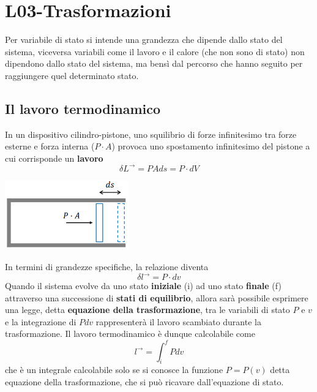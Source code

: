 \section{L03-Trasformazioni}
Per variabile di stato si intende una grandezza che dipende dallo stato del sistema, viceversa variabili come il lavoro e il calore (che non sono di stato) non dipendono dallo stato del sistema, ma bensì dal percorso che hanno seguito per raggiungere quel determinato stato.
\subsection{Il lavoro termodinamico}
In un dispositivo cilindro-pistone, uno squilibrio di forze infinitesimo tra forze esterne e forza interna ($P \cdot A$) provoca uno spostamento infinitesimo del pistone a cui corrisponde un \textbf{lavoro}
\[
    \delta L^\rightarrow  = P A ds = P \cdot dV
\]
\begin{center}
    \includegraphics[height=3cm]{../L03/img1.PNG}
\end{center}
In termini di grandezze specifiche, la relazione diventa
\[
    \delta l^\rightarrow = P \cdot dv
\]
Quando il sistema evolve da uno stato \textbf{iniziale} (i) ad uno stato \textbf{finale} (f) attraverso una successione di \textbf{stati di equilibrio}, allora sarà possibile esprimere una legge, detta \textbf{equazione della trasformazione}, tra le variabili di stato $P$ e $v$ e la integrazione di $P dv$ rappresenterà il lavoro scambiato durante la trasformazione.\newline
Il lavoro termodinamico è dunque calcolabile come
\[
    l^\rightarrow = \int_{i}^{f}Pdv
\]
che è un integrale calcolabile solo se si conosce la funzione $P = P (v)$ detta equazione della trasformazione, che si può ricavare dall'equazione di stato.
